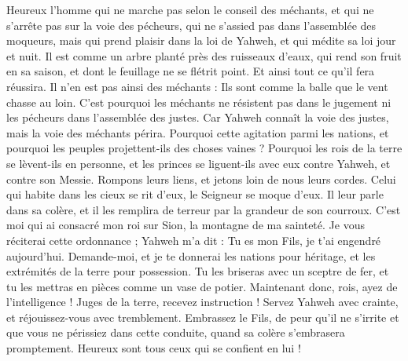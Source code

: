 \begin{multicols}{2}
\VerseOne{}Heureux l'homme qui ne marche pas selon le conseil des méchants, et qui ne s'arrête pas sur la voie des pécheurs, qui ne s'assied pas dans l’assemblée des moqueurs,
mais qui prend plaisir dans la loi de Yahweh, et qui médite sa loi jour et nuit.
Il est comme un arbre planté près des ruisseaux d'eaux, qui rend son fruit en sa saison, et dont le feuillage ne se flétrit point. Et ainsi tout ce qu'il fera réussira.
Il n'en est pas ainsi des méchants : Ils sont comme la balle que le vent chasse au loin.
C'est pourquoi les méchants ne résistent pas dans le jugement ni les pécheurs dans l'assemblée des justes.
Car Yahweh connaît la voie des justes, mais la voie des méchants périra.
\VerseOne{}Pourquoi cette agitation parmi les nations, et pourquoi les peuples projettent-ils des choses vaines ?
Pourquoi les rois de la terre se lèvent-ils en personne, et les princes se liguent-ils avec eux contre Yahweh, et contre son Messie.
Rompons leurs liens, et jetons loin de nous leurs cordes.
Celui qui habite dans les cieux se rit d'eux, le Seigneur se moque d’eux.
Il leur parle dans sa colère, et il les remplira de terreur par la grandeur de son courroux.
C’est moi qui ai consacré mon roi sur Sion, la montagne de ma sainteté.
Je vous réciterai cette ordonnance ; Yahweh m'a dit : Tu es mon Fils, je t'ai engendré aujourd’hui.
Demande-moi, et je te donnerai les nations pour héritage, et les extrémités de la terre pour possession.
Tu les briseras avec un sceptre de fer, et tu les mettras en pièces comme un vase de potier.
Maintenant donc, rois, ayez de l'intelligence ! Juges de la terre, recevez instruction !
Servez Yahweh avec crainte, et réjouissez-vous avec tremblement.
Embrassez le Fils, de peur qu'il ne s'irrite et que vous ne périssiez dans cette conduite, quand sa colère s'embrasera promptement. Heureux sont tous ceux qui se confient en lui !

\end{multicols}
